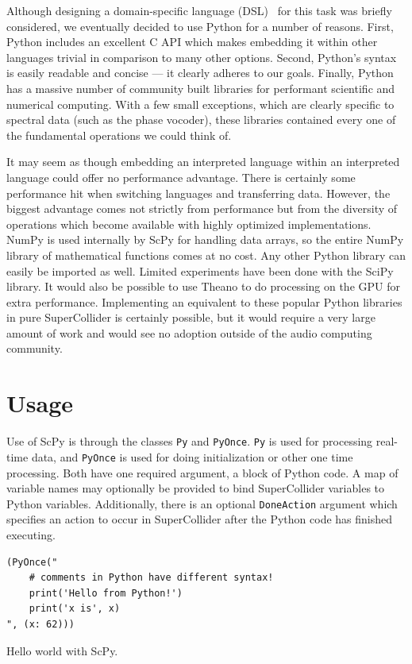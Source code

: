 \documentclass{article}
\begin{document}
Although designing a domain-specific language (DSL)~\cite{van2000domain} for this task was briefly
considered, we eventually decided to use Python for a number of reasons. First, Python includes an
excellent C API which makes embedding it within other languages trivial in comparison to many other
options.  Second, Python's syntax is easily readable and concise --- it clearly adheres to our
goals. Finally, Python has a massive number of community built libraries for performant scientific
and numerical computing. With a few small exceptions, which are clearly specific to spectral data
(such as the phase vocoder), these libraries contained every one of the fundamental operations we
could think of.

It may seem as though embedding an interpreted language within an interpreted language could offer
no performance advantage. There is certainly some performance hit when switching languages and
transferring data. However, the biggest advantage comes not strictly from performance but from the
diversity of operations which become available with highly optimized implementations. NumPy is used
internally by ScPy for handling data arrays, so the entire NumPy library of mathematical functions
comes at no cost.  Any other Python library can easily be imported as well. Limited experiments
have been done with the SciPy library. It would also be possible to use Theano to do processing on
the GPU for extra performance. Implementing an equivalent to these popular Python libraries in pure
SuperCollider is certainly possible, but it would require a very large amount of work and would see
no adoption outside of the audio computing community.

\section{Usage}\label{sec:usage}

Use of ScPy is through the classes \texttt{Py} and \texttt{PyOnce}. \texttt{Py} is used for
processing real-time data, and \texttt{PyOnce} is used for doing initialization or other one time
processing. Both have one required argument, a block of Python code. A map of variable names may
optionally be provided to bind SuperCollider variables to Python variables.  Additionally, there is
an optional \texttt{DoneAction} argument which specifies an action to occur in SuperCollider after
the Python code has finished executing.

\begin{listing}[H]
    \begin{verbatim}
(PyOnce("
    # comments in Python have different syntax!
    print('Hello from Python!')
    print('x is', x)
", (x: 62)))
    \end{verbatim}
    \caption{Hello world with ScPy.}
    \label{lst:helloworld}
\end{listing}
\end{document}
